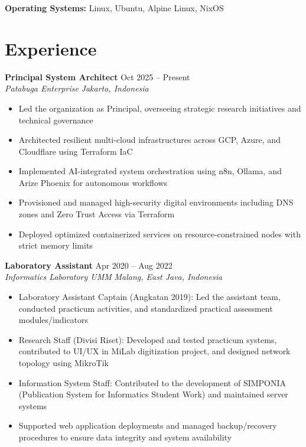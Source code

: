 \documentclass[11pt,a4paper]{article}
\newcommand{\jobentry}[4]{%
    \vspace{1pt}
    \textbf{#1} \hfill {#2} \\
    \textit{#3} \hfill \textit{#4}
}
\newcommand{\skillcat}[2]{%
    \textbf{#1:} #2
}
\begin{document}
\skillcat{Operating Systems}{Linux, Ubuntu, Alpine Linux, NixOS}

\section*{Experience}

\jobentry{Principal System Architect}{Oct 2025 -- Present}
{Patabuga Enterprise}{Jakarta, Indonesia}
\begin{itemize}[leftmargin=*,nosep,topsep=2pt,itemsep=0.5pt]
    \item Led the organization as Principal, overseeing strategic research initiatives and technical governance
    \item Architected resilient multi-cloud infrastructures across GCP, Azure, and Cloudflare using Terraform IaC
    \item Implemented AI-integrated system orchestration using n8n, Ollama, and Arize Phoenix for autonomous workflows
    \item Provisioned and managed high-security digital environments including DNS zones and Zero Trust Access via Terraform
    \item Deployed optimized containerized services on resource-constrained nodes with strict memory limits
\end{itemize}

\vspace{3pt}

\jobentry{Laboratory Assistant}{Apr 2020 -- Aug 2022}
{Informatics Laboratory UMM}{Malang, East Java, Indonesia}
\begin{itemize}[leftmargin=*,nosep,topsep=2pt,itemsep=0.5pt]
    \item Laboratory Assistant Captain (Angkatan 2019): Led the assistant team, conducted practicum activities, and standardized practical assessment modules/indicators
    \item Research Staff (Divisi Riset): Developed and tested practicum systems, contributed to UI/UX in MiLab digitization project, and designed network topology using MikroTik
    \item Information System Staff: Contributed to the development of SIMPONIA (Publication System for Informatics Student Work) and maintained server systems
    \item Supported web application deployments and managed backup/recovery procedures to ensure data integrity and system availability
\end{itemize}
\end{document}
